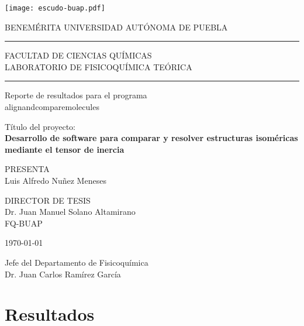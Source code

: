 \documentclass[12pt]{article}
\newcommand\tab[1][0.5cm]{\hspace*{#1}}
\newcommand\vtab[1][0.5cm]{\vspace*{#1}}
\begin{document}
\pagestyle{empty} 

\begin{center}
\texttt{[image: escudo-buap.pdf]}

BENEMÉRITA UNIVERSIDAD AUTÓNOMA DE PUEBLA\\
\rule{150mm}{0.1mm}
FACULTAD DE CIENCIAS QUÍMICAS\\
LABORATORIO DE FISICOQUÍMICA TEÓRICA
\rule{150mm}{0.1mm}

\vtab
\Large{Reporte de resultados para el programa \\ alignandcomparemolecules}\\
\vtab[.3cm]

\large{Título del proyecto: \\ \textbf{Desarrollo de software para comparar y resolver estructuras isoméricas mediante el tensor de inercia}}\\
\vtab[0.5cm]

PRESENTA\\
Luis Alfredo Nuñez Meneses \\
\vtab[0.5cm]

\tab[-0.5cm]
\begin{minipage}[t]{0.5\textwidth}
\begin{center}
DIRECTOR DE TESIS  \\
Dr. Juan Manuel Solano Altamirano \\
FQ-BUAP \\
\end{center}
\end{minipage}

\vtab[0.5cm]
\today\\
\end{center}

\begin{flushright}
  \large{Jefe del Departamento de Fisicoquímica\\
  Dr. Juan Carlos Ramírez García}\\
\end{flushright}

\newpage

\section{Resultados}
\end{document}
